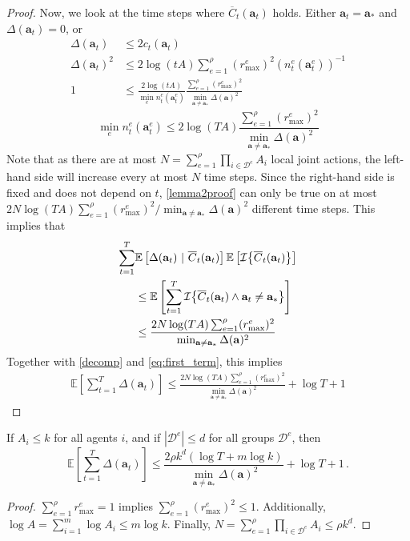\begin{proof}
Now, we look at the time steps where $\overline{C}_t(\mathbf{a}_t)$ holds. Either $\mathbf{a}_t =
\mathbf{a}_*$ and $\Delta(\mathbf{a}_t) = 0$, or
\begin{align*}
\Delta(\mathbf{a}_t) &\le 2 c_t(\mathbf{a}_t) \\
\Delta(\mathbf{a}_t)^2 &\le 2 \log(t A) \sum_{e=1}^\rho (r_{\max}^e)^2(n^e_t(\mathbf{a}^e_t))^{-1} \\
1 &\le \frac{2 \log(t A)}{\min_e n^e_t(\mathbf{a}^e_t)} \frac{\sum_{e=1}^\rho
(r_{\max}^e)^2}{\min_{\mathbf{a} \neq \mathbf{a}_*}\Delta(\mathbf{a})^2}
\end{align*}
\begin{equation}
\min_e n^e_t(\mathbf{a}^e_t) \le 2 \log(T A)\frac{\sum_{e=1}^\rho
(r_{\max}^e)^2}{\min_{\mathbf{a} \neq \mathbf{a}_*}\Delta(\mathbf{a})^2} \label{lemma2proof}
\end{equation}
Note that as there are at most $N=\sum_{e=1}^\rho \prod_{i \in \mathcal{D}^e} A_i$ local joint actions, the left-hand side will
increase every at most $N$ time steps. Since the right-hand side is fixed and does not depend on
$t$, \eqref{lemma2proof} can only be true on at most $2 N \log ( T A )\sum_{e=1}^\rho
(r_{\max}^e)^2 / \min_{\mathbf{a} \neq \mathbf{a}_*} \Delta(\mathbf{a})^2$ different time steps.
This implies that
\begin{align*}
\sum_{t=1}^T &\mathbb{E}\left[\Delta(\mathbf{a}_t)\ |\ \overline{C}_t(\mathbf{a}_t)\right] \mathbb{E}\left[\ind{\overline{C}_t(\mathbf{a}_t)}\right]\\
&\le \mathbb{E}\left[\sum_{t=1}^T
\ind{\overline{C}_t(\mathbf{a}_t) \land \mathbf{a}_t \neq \mathbf{a}_*}\right] \\
&\le
\frac{2 N\log ( T A ) \sum_{e=1}^\rho (r_{\max}^e)^2 }{\min_{\mathbf{a} \neq\mathbf{a}_*} \Delta(\mathbf{a})^2}
\end{align*}
Together with \eqref{decomp} and \eqref{eq:first_term}, this implies
\begin{align*}
\mathbb{E} \left[ \sum_{t=1}^T \Delta(\mathbf{a}_t) \right] \le \frac{2 N \log ( T A ) \sum_{e=1}^\rho (r_{\max}^e)^2}{\min_{\mathbf{a} \neq\mathbf{a}_*}\Delta(\mathbf{a})^2} + \log T + 1
\end{align*}
\end{proof}

\begin{corollary}\label{cor1}
If $A_i \le k$ for all agents $i$, and if $|\mathcal{D}^e| \le d$ for all groups $\mathcal{D}^e$, then
\[
\mathbb{E} \left[ \sum_{t=1}^T \Delta(\mathbf{a}_t) \right] \le\frac{2\rho k^d \left( \log T + m \log k \right)}{\min_{\mathbf{a} \neq\mathbf{a}_*} \Delta(\mathbf{a})^2} + \log T + 1\,.
\]
\end{corollary}
\begin{proof}
$\sum_{e=1}^\rho r_{\max}^e = 1$ implies $\sum_{e=1}^\rho (r_{\max}^e)^2 \le 1$.
Additionally, $\log A = \sum_{i=1}^m \log A_i \le m \log k$.
Finally, $N = \sum_{e=1}^\rho \prod_{i \in \mathcal{D}^e} A_i \le \rho k^d$.
\end{proof}

